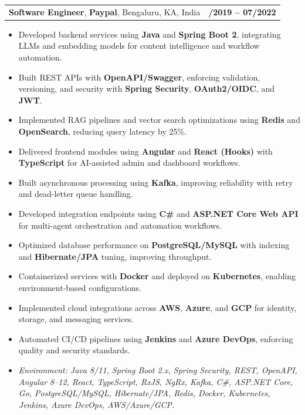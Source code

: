 \documentclass[letterpaper,11pt]{article}
\makeatletter
\newcommand{\resumeItem}[1]{
  \item\footnotesize{
    {#1 \vspace{-2pt}}
  }
}
\newcommand{\resumeSubheading}[4]{
  \vspace{-2pt}\item
    \begin{tabular*}{1.0\textwidth}[t]{l@{\extracolsep{\fill}}r}
      \textbf{\fontsize{10pt}{14pt}\selectfont #3}, \textbf{\fontsize{10pt}{14pt}\selectfont #1}, \fontsize{10pt}{14pt}\selectfont #4 & \textbf{\fontsize{10pt}{14pt}\selectfont #2} \\
    \end{tabular*}\vspace{-7pt}
}
\newcommand{\resumeItemListStart}{\begin{itemize}[leftmargin=*]}
\newcommand{\resumeItemListEnd}{\end{itemize}\vspace{-5pt}}
\makeatother
\begin{document}
\resumeSubheading
{Paypal}{08/2019 -- 07/2022}
{Software Engineer}{Bengaluru, KA, India}
\resumeItemListStart
  \resumeItem{Developed backend services using \textbf{Java} and \textbf{Spring Boot 2}, integrating LLMs and embedding models for content intelligence and workflow automation.}
  \resumeItem{Built REST APIs with \textbf{OpenAPI/Swagger}, enforcing validation, versioning, and security with \textbf{Spring Security}, \textbf{OAuth2/OIDC}, and \textbf{JWT}.}
  \resumeItem{Implemented RAG pipelines and vector search optimizations using \textbf{Redis} and \textbf{OpenSearch}, reducing query latency by 25\%.}
  \resumeItem{Delivered frontend modules using \textbf{Angular} and \textbf{React (Hooks)} with \textbf{TypeScript} for AI-assisted admin and dashboard workflows.}
  \resumeItem{Built asynchronous processing using \textbf{Kafka}, improving reliability with retry and dead-letter queue handling.}
  \resumeItem{Developed integration endpoints using \textbf{C\#} and \textbf{ASP.NET Core Web API} for multi-agent orchestration and automation workflows.}
  \resumeItem{Optimized database performance on \textbf{PostgreSQL/MySQL} with indexing and \textbf{Hibernate/JPA} tuning, improving throughput.}
  \resumeItem{Containerized services with \textbf{Docker} and deployed on \textbf{Kubernetes}, enabling environment-based configurations.}
  \resumeItem{Implemented cloud integrations across \textbf{AWS}, \textbf{Azure}, and \textbf{GCP} for identity, storage, and messaging services.}
  \resumeItem{Automated CI/CD pipelines using \textbf{Jenkins} and \textbf{Azure DevOps}, enforcing quality and security standards.}
  \resumeItem{\textit{Environment: Java 8/11, Spring Boot 2.x, Spring Security, REST, OpenAPI, Angular 8--12, React, TypeScript, RxJS, NgRx, Kafka, C\#, ASP.NET Core, Go, PostgreSQL/MySQL, Hibernate/JPA, Redis, Docker, Kubernetes, Jenkins, Azure DevOps, AWS/Azure/GCP.}}
\resumeItemListEnd
\end{document}
